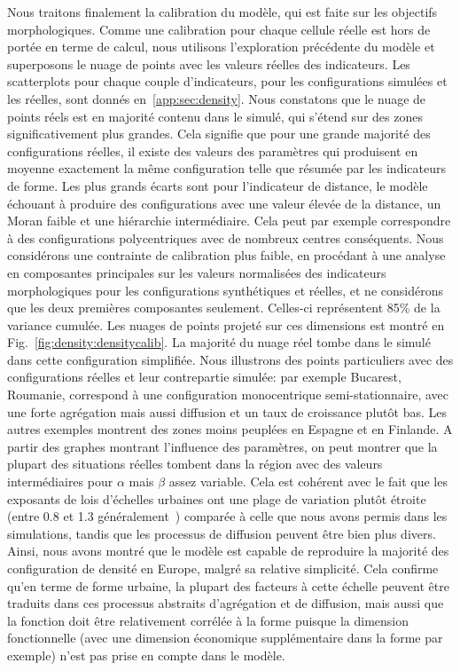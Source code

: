 {Nous traitons finalement la calibration du modèle, qui est faite sur les objectifs morphologiques. Comme une calibration pour chaque cellule réelle est hors de portée en terme de calcul, nous utilisons l'exploration précédente du modèle et superposons le nuage de points avec les valeurs réelles des indicateurs. Les scatterplots pour chaque couple d'indicateurs, pour les configurations simulées et les réelles, sont donnés en~\ref{app:sec:density}. Nous constatons que le nuage de points réels est en majorité contenu dans le simulé, qui s'étend sur des zones significativement plus grandes. Cela signifie que pour une grande majorité des configurations réelles, il existe des valeurs des paramètres qui produisent en moyenne exactement la même configuration telle que résumée par les indicateurs de forme. Les plus grands écarts sont pour l'indicateur de distance, le modèle échouant à produire des configurations avec une valeur élevée de la distance, un Moran faible et une hiérarchie intermédiaire. Cela peut par exemple correspondre à des configurations polycentriques avec de nombreux centres conséquents. Nous considérons une contrainte de calibration plus faible, en procédant à une analyse en composantes principales sur les valeurs normalisées des indicateurs morphologiques pour les configurations synthétiques et réelles, et ne considérons que les deux premières composantes seulement. Celles-ci représentent 85\% de la variance cumulée. Les nuages de points projeté sur ces dimensions est montré en Fig.~\ref{fig:density:densitycalib}. La majorité du nuage réel tombe dans le simulé dans cette configuration simplifiée. Nous illustrons des points particuliers avec des configurations réelles et leur contrepartie simulée: par exemple Bucarest, Roumanie, correspond à une configuration monocentrique semi-stationnaire, avec une forte agrégation mais aussi diffusion et un taux de croissance plutôt bas. Les autres exemples montrent des zones moins peuplées en Espagne et en Finlande. A partir des graphes montrant l'influence des paramètres, on peut montrer que la plupart des situations réelles tombent dans la région avec des valeurs intermédiaires pour $\alpha$ mais $\beta$ assez variable. Cela est cohérent avec le fait que les exposants de lois d'échelles urbaines ont une plage de variation plutôt étroite (entre 0.8 et 1.3 généralement~\cite{pumain2006evolutionary}) comparée à celle que nous avons permis dans les simulations, tandis que les processus de diffusion peuvent être bien plus divers. Ainsi, nous avons montré que le modèle est capable de reproduire la majorité des configuration de densité en Europe, malgré sa relative simplicité. Cela confirme qu'en terme de forme urbaine, la plupart des facteurs à cette échelle peuvent être traduits dans ces processus abstraits d'agrégation et de diffusion, mais aussi que la fonction doit être relativement corrélée à la forme puisque la dimension fonctionnelle (avec une dimension économique supplémentaire dans la forme par exemple) n'est pas prise en compte dans le modèle. 
}



